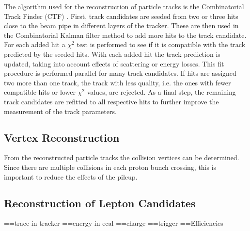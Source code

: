\noindent The algorithm used for the reconstruction of particle tracks is the Combinatorial Track Finder (CTF) \cite{ctf1,ctf2}. First, track candidates are seeded from two or three hits close to the beam pipe in different layers of the tracker. These are then used in the Combinatorial Kalman filter method \cite{kalman} to add more hits to the track candidate. For each added hit a $\chi^2$ test is performed to see if it is compatible with the track predicted by the seeded hits. With each added hit the track prediction is updated, taking into account effects of scattering or energy losses. This fit procedure is performed parallel for many track candidates. If hits are assigned two more than one track, the track with less quality, i.e. the ones with fewer compatible hits or lower $\chi^2$ values, are rejected. As a final step, the remaining track candidates are refitted to all respective hits to further improve the measurement of the track parameters.

\subsection{Vertex Reconstruction}
From the reconstructed particle tracks the collision vertices can be determined. Since there are multiple collisions in each proton bunch crossing, this is important to reduce the effects of the pileup. 
\subsection{Reconstruction of Lepton Candidates}
==trace in tracker
==energy in ecal
==charge
==trigger
==Efficiencies
